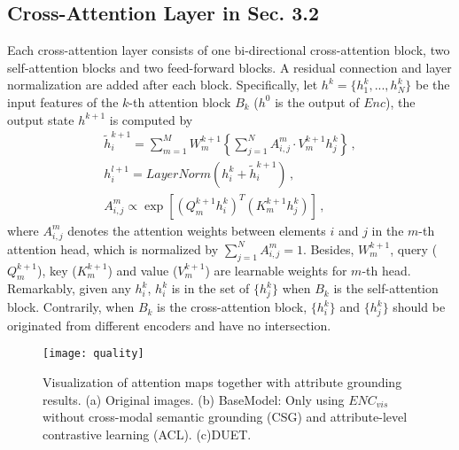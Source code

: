\documentclass[letterpaper]{article} \usepackage{aaai23}  \usepackage{times}  \usepackage{helvet}  \usepackage{courier}  \usepackage[hyphens]{url}  \usepackage{graphicx} \urlstyle{rm} \def\UrlFont{\rm}  \usepackage{natbib}  \usepackage{caption} \frenchspacing  \setlength{\pdfpagewidth}{8.5in}  \setlength{\pdfpageheight}{11in}  \usepackage{algorithm}
\begin{document}
\subsection{Cross-Attention Layer in Sec. 3.2} \label{apd:cross}
Each cross-attention layer consists of one bi-directional cross-attention block, two self-attention blocks and two feed-forward blocks. A residual connection and
layer normalization are added after each block. 
Specifically, let $h^k = \{h_1^k, ..., h_N^k\}$ be the input features of the $k$-th attention block $B_k$ ($h^0$ is the output of $Enc$), the output state $h^{k+1}$ is computed by
\begin{align}
\tilde{h}_{i}^{k+1}=\sum\nolimits_{m=1}^{M} W_{m}^{k+1}\left\{\sum\nolimits_{j=1}^{N} A_{i, j}^{m} \cdot V_{m}^{k+1} h_{j}^{k}\right\} \,,\\
h_{i}^{l+1}=LayerNorm\left(h_{i}^{k}+\tilde{h}_{i}^{k+1}\right) \,,\\
A_{i, j}^{m} \propto \exp \left[\left(Q_{m}^{k+1} h_{i}^{k}\right)^{T}\left(K_{m}^{k+1} h_{j}^{k}\right)\right]\,,
\end{align}
where $A_{i, j}^{m}$ denotes the attention weights between elements $i$ and $j$ in the $m$-th attention head, which is normalized by $\sum_{j=1}^{N} A_{i, j}^{m}=1$. Besides, $W_m^{k+1}$, query ($Q_m^{k+1}$), key ($K_m^{k+1}$) and value ($V_m^{k+1}$) are learnable weights for $m$-th head. 
Remarkably, given any $h_i^k$,  $h_i^k$ is in the set of $\{h_j^k\}$ when $B_k$ is the self-attention block. 
Contrarily, when $B_k$ is the cross-attention block, $\{h_i^k\}$ and $\{h_j^k\}$ should be originated from different encoder{s} and have no intersection. 

\begin{figure*}[htbp]
  \centering
  \texttt{[image: quality]}
  \caption{Visualization of attention maps together with attribute grounding results.
    (a) Original images.
  	(b) BaseModel: Only using $ENC_{vis}$ without cross-modal semantic grounding (CSG) and attribute-level contrastive learning (ACL).
	(c)DUET.
  }
  \label{fig:Visualization}
\end{figure*}
\end{document}
